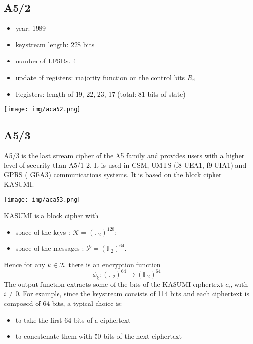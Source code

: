 \documentclass[a4paper, 10pt, titlepage]{article}
\begin{document}
\subsection{A5/2}
\begin{itemize}
\item year: 1989
\item keystream length: 228 bits
\item number of LFSRs: 4
\item update of registers: majority function on the control bits $R_4$
\item Registers: length of 19, 22, 23, 17 (total: 81 bits of state)
\end{itemize}
\begin{center}
\texttt{[image: img/aca52.png]}
\end{center}
\subsection{A5/3}
A5/3 is the last stream cipher of the A5 family and provides users with a higher level of security than A5/1-2. It is used in GSM, UMTS (f8-UEA1, f9-UIA1) and GPRS ( GEA3) communications systems. It is based on the block cipher KASUMI.
\begin{center}
\texttt{[image: img/aca53.png]}
\end{center}
KASUMI is a block cipher with
\begin{itemize}
\item space of the keys : $\mathcal{K} = (\mathbb{F}_2)^{128}$;
\item space of the messages : $\mathcal{P} = (\mathbb{F}_2)^{64}$.
\end{itemize}
Hence for any $k \in \mathcal{K}$ there is an encryption function
$$\phi_k: (\mathbb{F}_2)^{64} \rightarrow (\mathbb{F}_2)^{64}$$
The output function extracts some of the bits of the KASUMI ciphertext $c_i$, with $i \neq 0$.
For example, since the keystream consists of 114 bits and each ciphertext is composed of 64 bits, a typical choice is:
\begin{itemize}
\item to take the first 64 bits of a ciphertext
\item to concatenate them with 50 bits of the next ciphertext
\end{itemize}
\end{document}
